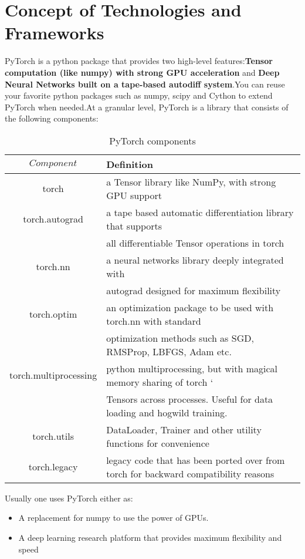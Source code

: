\section{Concept of Technologies and Frameworks}\label{sec:4.3}
\par PyTorch is a python package that provides two high-level features:\textbf{Tensor computation (like numpy) with strong GPU acceleration} and \textbf{Deep Neural Networks built on a tape-based autodiff system}.You can reuse your favorite python packages such as numpy, scipy and Cython to extend PyTorch when needed.At a granular level, PyTorch is a library that consists of the following components:
\begin{table}[tbp]
	\centering
	\caption{PyTorch components}
	\label{tab:sample}
	\begin{tabular}{cl}
		\toprule
		$Component$ 			& Definition 																			\\ \midrule
		torch  					& a Tensor library like NumPy, with strong GPU support 									\\
		torch.autograd 			& a tape based automatic differentiation library that supports 							\\ 
								& all differentiable Tensor operations in torch 										\\
		torch.nn  				& a neural networks library deeply integrated with 					 					\\
								& autograd designed for maximum  flexibility 											\\
		torch.optim  			& an optimization package to be used with torch.nn with standard 						\\  
								& optimization  methods such as SGD, RMSProp, LBFGS, Adam etc.							\\
		torch.multiprocessing 	& python multiprocessing, but with magical memory sharing of torch  		`			\\ 
								& Tensors across processes. Useful for data loading and hogwild training. 				\\
		torch.utils  			& DataLoader, Trainer and other utility functions for convenience 						\\
		torch.legacy  			& legacy code that has been ported over from torch for backward compatibility reasons 	\\
		\bottomrule
	\end{tabular}
\end{table}

\noindent Usually one uses PyTorch either as:
\begin{itemize}
	\item A replacement for numpy to use the power of GPUs.
	\item A deep learning research platform that provides maximum flexibility and speed
\end{itemize}

